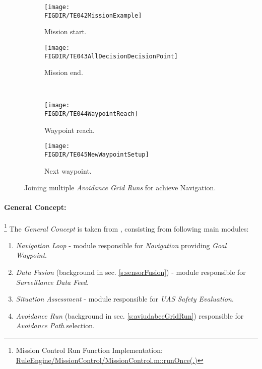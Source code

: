 \begin{figure}[H]
    \centering
    \begin{subfigure}{0.48\textwidth}
        \centering
        \texttt{[image: \\FIGDIR/TE042MissionExample]}
        \caption{Mission start.}
        \label{fig:missionExampleWithOAGR}
    \end{subfigure}
    \begin{subfigure}{0.48\textwidth}
    	\centering
        \texttt{[image: \\FIGDIR/TE043AllDecisionDecisionPoint]} 
        \caption{Mission end.}
        \label{fig:finishedMissionAGR}
    \end{subfigure}
    \\
    \centering
    \begin{subfigure}{0.48\textwidth}
        \centering
        \texttt{[image: \\FIGDIR/TE044WaypointReach]}
        \caption{Waypoint reach.}
        \label{fig:waypointReachAGR}
    \end{subfigure}
    \begin{subfigure}{0.48\textwidth}
    	\centering
        \texttt{[image: \\FIGDIR/TE045NewWaypointSetup]} 
        \caption{Next waypoint.}
        \label{fig:newtWaypointAGR}
    \end{subfigure}
    \caption{Joining multiple \emph{Avoidance Grid Runs} for achieve Navigation.}
    \label{fig:joiningMultipleAGRS }
    
\end{figure}
    
    

\newpage
\paragraph{General Concept:}\footnote{Mission Control Run Function Implementation: \url{RuleEngine/MissionControl/MissionControl.m::runOnce(.)}} The \emph{General Concept} is taken from  \cite{sabatini2014navigation,Sabatini2014}, consisting from following main modules:
\begin{enumerate}
    \item \emph{Navigation Loop} - module responsible for \emph{Navigation} providing \emph{Goal Waypoint}.
    
    \item \emph{Data Fusion} (background in sec. \ref{s:sensorFusion}) - module responsible for \emph{Surveillance Data Feed}.
    
    \item \emph{Situation Assessment} - module responsible for \emph{UAS Safety Evaluation}. 
    
    \item \emph{Avoidance Run} (background in sec. \ref{s:aviudabceGridRun}) responsible for \emph{Avoidance Path} selection.    
\end{enumerate}


